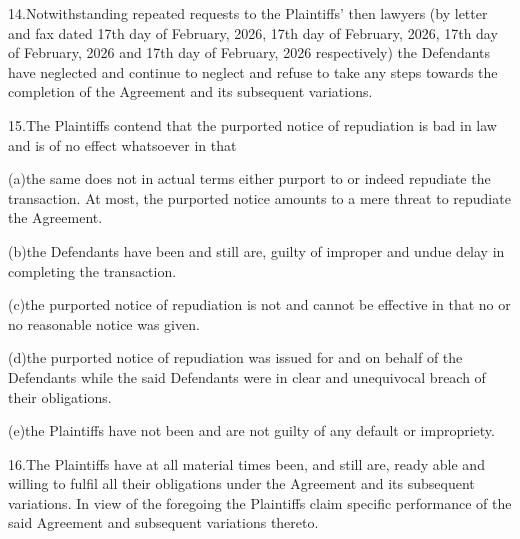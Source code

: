\documentclass[12pt,a4paper]{article}
\begin{document}
\begin{justify}14.Notwithstanding repeated requests to the Plaintiffs' then lawyers (by letter and fax dated 17th day of February, 2026, 17th day of February, 2026, 17th day of February, 2026 and 17th day of February, 2026 respectively) the Defendants have neglected and continue to neglect and refuse to take any steps towards the completion of the Agreement and its subsequent variations.\end{justify}


\begin{justify}15.The Plaintiffs contend that the purported notice of repudiation is bad in law and is of no effect whatsoever in that\end{justify}


\begin{justify}(a)the same does not in actual terms either purport to or indeed repudiate the transaction.  At most, the purported notice amounts to a mere threat to repudiate the Agreement.\end{justify}


\begin{justify}(b)the Defendants have been and still are, guilty of improper and undue delay in completing the transaction.\end{justify}


\begin{justify} (c)the purported notice of repudiation is not and cannot be effective in that no or no reasonable notice was given.\end{justify}


\begin{justify}(d)the purported notice of repudiation was issued for and on behalf of the Defendants while the said Defendants were in clear and unequivocal breach of their obligations.\end{justify}


\begin{justify}(e)the Plaintiffs have not been and are not guilty of any default or impropriety.\end{justify}


\begin{justify}16.The Plaintiffs have at all material times been, and still are, ready able and willing to fulfil all their obligations under the Agreement and its subsequent variations.  In view of the foregoing the Plaintiffs claim specific performance of the said Agreement and subsequent variations thereto.\end{justify}
\end{document}
